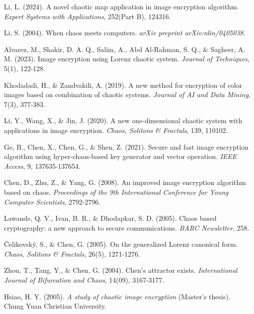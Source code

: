  Li, L. (2024). A novel chaotic map application in image encryption algorithm. \textit{Expert Systems with Applications}, 252(Part B), 124316.



 Li, S. (2004). When chaos meets computers. \textit{arXiv preprint arXiv:nlin/0405038}.



 Alvarez, M., Shakir, D. A. Q., Salim, A., Abd Al-Rahman, S. Q., \& Sagheer, A. M. (2023). Image encryption using Lorenz chaotic system. \textit{Journal of Techniques}, 5(1), 122-128.



 Khodadadi, H., \& Zandvakili, A. (2019). A new method for encryption of color images based on combination of chaotic systems. \textit{Journal of AI and Data Mining}, 7(3), 377-383.



 Li, Y., Wang, X., \& Jin, J. (2020). A new one-dimensional chaotic system with applications in image encryption. \textit{Chaos, Solitons \& Fractals}, 139, 110102.



 Ge, B., Chen, X., Chen, G., \& Shen, Z. (2021). Secure and fast image encryption algorithm using hyper-chaos-based key generator and vector operation. \textit{IEEE Access}, 9, 137635-137654.



 Chen, D., Zhu, Z., \& Yang, G. (2008). An improved image encryption algorithm based on chaos. \textit{Proceedings of the 9th International Conference for Young Computer Scientists}, 2792-2796.



 Lawande, Q. V., Ivan, B. R., \& Dhodapkar, S. D. (2005). Chaos based cryptography: a new approach to secure communications. \textit{BARC Newsletter}, 258.



 Čelikovský, S., \& Chen, G. (2005). On the generalized Lorenz canonical form. \textit{Chaos, Solitons \& Fractals}, 26(5), 1271-1276.



 Zhou, T., Tang, Y., \& Chen, G. (2004). Chen's attractor exists. \textit{International Journal of Bifurcation and Chaos}, 14(09), 3167-3177.



 Hsiao, H. Y. (2005). \textit{A study of chaotic image encryption} (Master's thesis). Chung Yuan Christian University.



